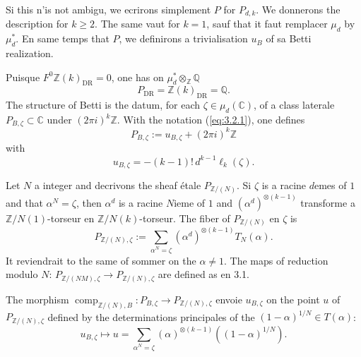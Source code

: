 \documentclass[12pt,a4paper]{article}
\theoremstyle{plain}
\theoremstyle{definition}
\theoremstyle{remark}
\providecommand{\DR}{\mathrm{DR}}
\providecommand{\comp}{\operatorname{comp}}
\begin{document}
Si this n'is not ambigu, we ecrirons simplement $P$ for $P_{d,k}$. We donnerons the
description for $k \geq 2$. The same vaut for $k = 1$, sauf that it faut remplacer
$\mu_d$ by $\mu_d^*$. En same temps that $P$, we definirons a trivialisation
$u_B$ of sa Betti realization.

Puisque $F^0 \mathbb{Z}(k)_{\DR} = 0$, one has on $\mu_d^* \otimes_{\mathbb{Z}} \mathbb{Q}$
\[
P_{\DR} = \mathbb{Z}(k)_{\DR} = \mathbb{Q}.
\]
The structure of Betti is the datum, for each $\zeta \in \mu_d(\mathbb{C})$, of a
class laterale $P_{B,\zeta} \subset \mathbb{C}$ under $(2\pi i)^k \mathbb{Z}$. With the
notation (\ref{eq:3.2.1}), one defines
\begin{equation}\label{eq:3.11.1}
P_{B,\zeta} := u_{B,\zeta} + (2\pi i)^k \mathbb{Z}
\end{equation}
with
\begin{equation*}
u_{B,\zeta} = -(k-1)!\, d^{k-1} \ell_k(\zeta).
\end{equation*}

Let $N$ a integer and decrivons the sheaf étale $P_{\mathbb{Z}/(N)}$. Si $\zeta$
is a racine $d$emes of $1$ and that $\alpha^N = \zeta$, then $\alpha^d$ is a
racine $N$ieme of $1$ and $(\alpha^d)^{\otimes(k-1)}$ transforme a
$\mathbb{Z}/N(1)$-torseur en $\mathbb{Z}/N(k)$-torseur. The fiber of
$P_{\mathbb{Z}/(N)}$ en $\zeta$ is
\begin{equation}\label{eq:3.11.2}
P_{\mathbb{Z}/(N),\zeta} := \sum_{\alpha^N=\zeta} (\alpha^d)^{\otimes(k-1)} T_N(\alpha).
\end{equation}
It reviendrait to the same of sommer on the $\alpha \neq 1$. The maps of
reduction modulo $N$: $P_{\mathbb{Z}/(NM),\zeta} \to P_{\mathbb{Z}/(N),\zeta}$ are
defined as en 3.1.

The morphism $\comp_{\mathbb{Z}/(N),B}: P_{B,\zeta} \to P_{\mathbb{Z}/(N),\zeta}$ envoie
$u_{B,\zeta}$ on the point $u$ of $P_{\mathbb{Z}/(N),\zeta}$ defined by the
determinations principales of the $(1-\alpha)^{1/N} \in T(\alpha)$:
\begin{equation}\label{eq:3.11.3}
u_{B,\zeta} \longmapsto u = \sum_{\alpha^N=\zeta} (\alpha)^{\otimes(k-1)}((1-\alpha)^{1/N}).
\end{equation}
\end{document}
